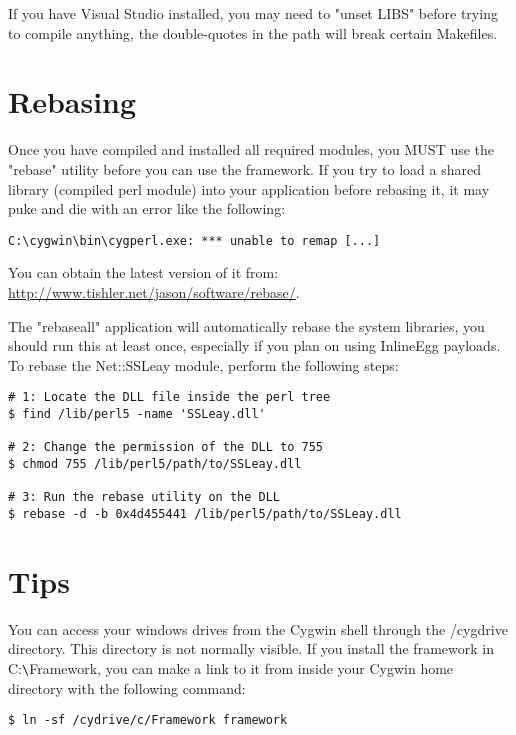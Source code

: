 \documentclass{report}
\begin{document}
\par
If you have Visual Studio installed, you may need to "unset LIBS" before trying
to compile anything, the double-quotes in the path will break certain Makefiles.


	\section{Rebasing}
\par
Once you have compiled and installed all required modules, you MUST use the
"rebase" utility before you can use the framework. If you try to load a shared
library (compiled perl module) into your application before rebasing it, it may
puke and die with an error like the following:

\begin{verbatim}
C:\cygwin\bin\cygperl.exe: *** unable to remap [...]
\end{verbatim}

\par
You can obtain the latest version of it from:
\url{http://www.tishler.net/jason/software/rebase/}.



\par
The "rebaseall" application will automatically rebase the system libraries, you
should run this at least once, especially if you plan on using InlineEgg payloads.
To rebase the Net::SSLeay module, perform the following steps:

\begin{verbatim}
# 1: Locate the DLL file inside the perl tree
$ find /lib/perl5 -name 'SSLeay.dll'

# 2: Change the permission of the DLL to 755
$ chmod 755 /lib/perl5/path/to/SSLeay.dll

# 3: Run the rebase utility on the DLL
$ rebase -d -b 0x4d455441 /lib/perl5/path/to/SSLeay.dll
\end{verbatim}


	\section{Tips}
\par
You can access your windows drives from the Cygwin shell through the /cygdrive
directory. This directory is not normally visible. If you install the framework
in C:\verb#\#Framework, you can make a link to it from inside your Cygwin home
directory with the following command: 

\begin{verbatim}
$ ln -sf /cydrive/c/Framework framework
\end{verbatim}
\end{document}
